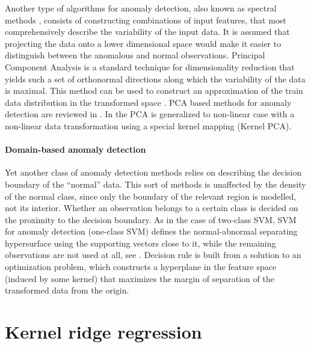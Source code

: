 \documentclass[a4paper,14pt]{extarticle}
\begin{document}
Another type of algorithms for anomaly detection, also known as spectral methods
\cite{chandola2009}, consists of constructing combinations of input features, that
most comprehensively describe the variability of the input data. It is assumed that
projecting the data onto a lower dimensional space would make it easier to distinguish
between the anomalous and normal observations. Principal Component Analysis is a
standard technique for dimensionality reduction that yields such a set of orthonormal
directions along which the variability of the data is maximal. This method can be
used to construct an approximation of the train data distribution in the transformed
space \cite{jolliffe2014}. PCA based methods for anomaly detection are reviewed in
\cite{dutta2007,shyu2003}. In \cite{hoffmann2007,scholkopf1998} the PCA is generalized
to non-linear case with a non-linear data transformation using a special kernel mapping
(Kernel PCA).


\paragraph{Domain-based anomaly detection} %
\label{par:domain_based_anomaly_detection}

Yet another class of anomaly detection methods relies on describing the decision
boundary of the ``normal'' data. This sort of methods is unaffected by the density
of the normal class, since only the boundary of the relevant region is modelled, not
its interior. Whether an observation belongs to a certain class is decided on the
proximity to the decision boundary. As in the case of two-class SVM, SVM for anomaly
detection (one-class SVM) defines the normal-abnormal separating hypersurface using
the supporting vectors close to it, while the remaining observations are not used
at all, see \cite{scholkopf1999,tax1999,manevitz2002}. Decision rule is built from
a solution to an optimization problem, which constructs a hyperplane in the feature
space (induced by some kernel) that maximizes the margin of separation of the transformed
data from the origin.



\section{Kernel ridge regression} %
\label{sec:kernel_ridge_regression}
\end{document}
